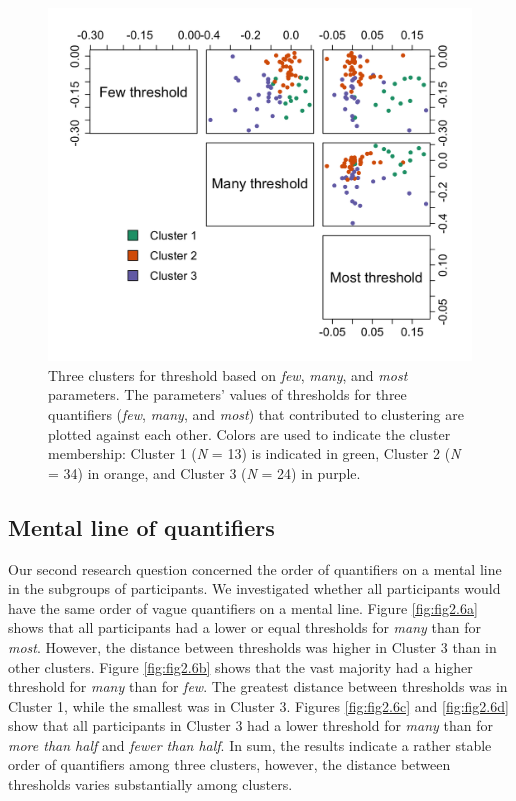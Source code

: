 \documentclass{article}
\begin{document}
\begin{figure} [H]
    \centering
    \includegraphics[width=\textwidth]{Figure2.9.png}
    \caption{Three clusters for threshold based on \textit{few}, \textit{many}, and \textit{most} parameters. The parameters' values of thresholds for three quantifiers (\textit{few}, \textit{many}, and \textit{most}) that contributed to clustering are plotted against each other. Colors are used to indicate the cluster membership: Cluster 1 (\textit{N} = 13) is indicated in green, Cluster 2 (\textit{N} = 34) in orange, and Cluster 3 (\textit{N} = 24) in purple.}
    \label{fig:fig2.9}
\end{figure}

\subsection{Mental line of quantifiers}
Our second research question concerned the order of quantifiers on a mental line in the subgroups of participants. %
We investigated whether all participants would have the same order of vague quantifiers on a mental line. Figure \ref{fig:fig2.6a} shows that all participants had a lower or equal thresholds for \textit{many} than for \textit{most}. However, the distance between thresholds was higher in Cluster 3 than in other clusters. Figure \ref{fig:fig2.6b} shows that the vast majority had a higher threshold for \textit{many} than for \textit{few}. The greatest distance between thresholds was in Cluster 1, while the smallest was in Cluster 3. Figures \ref{fig:fig2.6c} and \ref{fig:fig2.6d} show that all participants in Cluster 3 had a lower threshold for \textit{many} than for \textit{more than half} and \textit{fewer than half}. In sum, the results indicate a rather stable order of quantifiers among three clusters, however, the distance between thresholds varies substantially among clusters.
\end{document}

